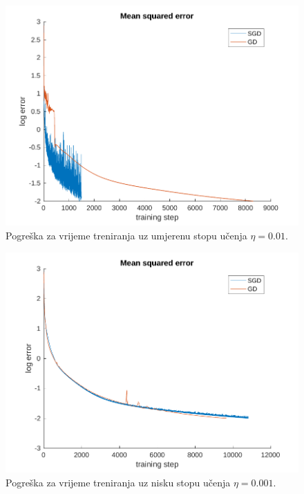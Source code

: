 \documentclass[12pt, a4paper]{article}
\begin{document}
\begin{figure}[H]
  \centering
  \includegraphics[width=\linewidth]{graf_normalna.pdf}
  \caption{Pogreška za vrijeme treniranja uz umjerenu stopu učenja $\eta=0.01$.}
\end{figure}

\begin{figure}[H]
  \centering
  \includegraphics[width=\linewidth]{graf_niska.pdf}
  \caption{Pogreška za vrijeme treniranja uz nisku stopu učenja $\eta=0.001$.}
\end{figure}
\end{document}
